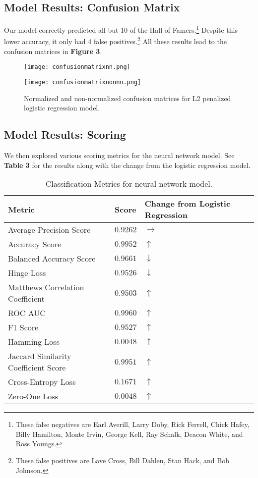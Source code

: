 \documentclass{sigkddExp}
\begin{document}
\subsection{Model Results: Confusion Matrix}
Our model correctly predicted all but 10 of the Hall of Famers.\footnote{These false negatives are Earl Averill, Larry Doby, Rick Ferrell, Chick Hafey, Billy Hamilton, Monte Irvin, George Kell, Ray Schalk, Deacon White, and Ross Youngs.} Despite this lower accuracy, it only had 4 false positives.\footnote{These false positives are Lave Cross, Bill Dahlen, Stan Hack, and Bob Johnson.} All these results lead to the confusion matrices in \textbf{Figure 3}.

\begin{figure}[htbp]
\begin{minipage}{.5\linewidth}
\texttt{[image: confusionmatrixnn.png]} 
\end{minipage}%
\begin{minipage}{.5\linewidth}
\texttt{[image: confusionmatrixnonnn.png]} 
\end{minipage}%
\caption{Normalized and non-normalized confusion matrices for L2 penalized logistic regression model.}
\end{figure}

\subsection{Model Results: Scoring}
We then explored various scoring metrics for the neural network model. See \textbf{Table 3} for the results along with the change from the logistic regression model.

\begin{table}
\caption{Classification Metrics for neural network model.}
\begin{tabular}{|p{3cm}|l|p{3cm}|} \hline
Metric&Score&Change from Logistic Regression\\ \hline
Average Precision Score&$0.9262$&$\rightarrow$\\ \hline
Accuracy Score&$0.9952$&$\uparrow$\\ \hline
Balanced Accuracy Score&$0.9661$&$\downarrow$\\ \hline
Hinge Loss&$0.9526$&$\downarrow$\\ \hline
Matthews Correlation Coefficient&$0.9503$&$\uparrow$\\ \hline
ROC AUC&$0.9960$&$\uparrow$\\ \hline
F1 Score&$0.9527$&$\uparrow$\\ \hline
Hamming Loss&$0.0048$&$\uparrow$\\ \hline
Jaccard Similarity Coefficient Score&$0.9951$&$\uparrow$\\ \hline
Cross-Entropy Loss&$0.1671$&$\uparrow$\\ \hline
Zero-One Loss&$0.0048$&$\uparrow$\\ \hline
\end{tabular}
\end{table}
\end{document}
